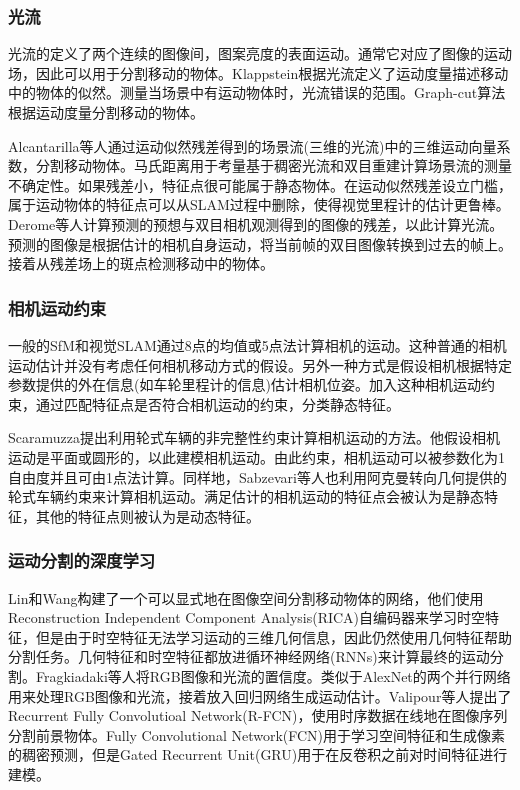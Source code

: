 \subsubsection{光流}
光流的定义了两个连续的图像间，图案亮度的表面运动\cite{Horn1980Determining}。通常它对应了图像的运动场，因此可以用于分割移动的物体。Klappstein\cite{Klappstein2008Moving}根据光流定义了运动度量描述移动中的物体的似然。测量当场景中有运动物体时，光流错误的范围。Graph-cut算法根据运动度量分割移动的物体。

Alcantarilla等人\cite{Alcantarilla2012On}通过运动似然残差得到的场景流(三维的光流)中的三维运动向量系数，分割移动物体。马氏距离用于考量基于稠密光流和双目重建计算场景流的测量不确定性。如果残差小，特征点很可能属于静态物体。在运动似然残差设立门槛，属于运动物体的特征点可以从SLAM过程中删除，使得视觉里程计的估计更鲁棒。Derome等人\cite{Derome2015Moving, Derome2014Real}计算预测的预想与双目相机观测得到的图像的残差，以此计算光流。预测的图像是根据估计的相机自身运动，将当前帧的双目图像转换到过去的帧上。接着从残差场上的斑点检测移动中的物体。

\subsubsection{相机运动约束}
一般的SfM和视觉SLAM通过8点的均值\cite{Longuet1981A}或5点法\cite{David2004An}计算相机的运动。这种普通的相机运动估计并没有考虑任何相机移动方式的假设。另外一种方式是假设相机根据特定参数提供的外在信息(如车轮里程计的信息)估计相机位姿。加入这种相机运动约束，通过匹配特征点是否符合相机运动的约束，分类静态特征。

Scaramuzza\cite{Scaramuzza20111}提出利用轮式车辆的非完整性约束计算相机运动的方法。他假设相机运动是平面或圆形的，以此建模相机运动。由此约束，相机运动可以被参数化为1自由度并且可由1点法计算\cite{Scaramuzza2009Real}。同样地，Sabzevari等人\cite{Sabzevari2016Multi}也利用阿克曼转向几何提供的轮式车辆约束来计算相机运动。满足估计的相机运动的特征点会被认为是静态特征，其他的特征点则被认为是动态特征。

\subsubsection{运动分割的深度学习}
Lin和Wang\cite{Lin2014Deep}构建了一个可以显式地在图像空间分割移动物体的网络，他们使用Reconstruction Independent Component Analysis(RICA)自编码器\cite{NIPS2011_4467,Le2013Building}来学习时空特征，但是由于时空特征无法学习运动的三维几何信息，因此仍然使用几何特征帮助分割任务。几何特征和时空特征都放进循环神经网络(RNNs)来计算最终的运动分割。Fragkiadaki等人\cite{Fragkiadaki2015Learning}将RGB图像和光流的置信度。类似于AlexNet\cite{Krizhevsky2012ImageNet}的两个并行网络用来处理RGB图像和光流，接着放入回归网络生成运动估计。Valipour等人\cite{Valipour2017Recurrent}提出了Recurrent Fully Convolutioal Network(R-FCN)，使用时序数据在线地在图像序列分割前景物体。Fully Convolutional Network(FCN)\cite{2014arXiv1411}用于学习空间特征和生成像素的稠密预测，但是Gated Recurrent Unit(GRU)用于在反卷积之前对时间特征进行建模。


